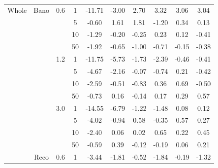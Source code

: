 \documentclass[conference]{IEEEtran}
\begin{document}
\begin{table}[htbp]
\begin{minipage}{\linewidth}
\begin{center}
{\begin{tabular}{|c|c|c|c|c|c|c|c|c|c|}
                    \hline
                    Whole        & Bano          & 0.6          & 1           & -11.71     & -3.00      & 2.70       & 3.32       & 3.06       & 3.04       \\
                    \cline{4-10} &               &              & 5           & -0.60      & 1.61       & 1.81       & -1.20      & 0.34       & 0.13       \\
                    \cline{4-10} &               &              & 10          & -1.29      & -0.20      & -0.25      & 0.23       & 0.12       & -0.41      \\
                    \cline{4-10} &               &              & 50          & -1.92      & -0.65      & -1.00      & -0.71      & -0.15      & -0.38      \\
                    \cline{3-10} &               & 1.2          & 1           & -11.75     & -5.73      & -1.73      & -2.39      & -0.46      & -0.41      \\
                    \cline{4-10} &               &              & 5           & -4.67      & -2.16      & -0.07      & -0.74      & 0.21       & -0.42      \\
                    \cline{4-10} &               &              & 10          & -2.59      & -0.51      & -0.83      & 0.36       & 0.69       & -0.50      \\
                    \cline{4-10} &               &              & 50          & -0.73      & 0.16       & -0.14      & 0.17       & 0.29       & 0.57       \\
                    \cline{3-10} &               & 3.0          & 1           & -14.55     & -6.79      & -1.22      & -1.48      & 0.08       & 0.12       \\
                    \cline{4-10} &               &              & 5           & -4.02      & -0.94      & 0.58       & -0.35      & 0.57       & 0.27       \\
                    \cline{4-10} &               &              & 10          & -2.40      & 0.06       & 0.02       & 0.65       & 0.22       & 0.45       \\
                    \cline{4-10} &               &              & 50          & -0.59      & 0.39       & -0.12      & -0.19      & 0.06       & 0.21       \\
                    \cline{2-10} & Reco          & 0.6          & 1           & -3.44      & -1.81      & -0.52      & -1.84      & -0.19      & -1.32      \\

\end{tabular}}
\end{center}
\end{minipage}
\end{table}
\end{document}
